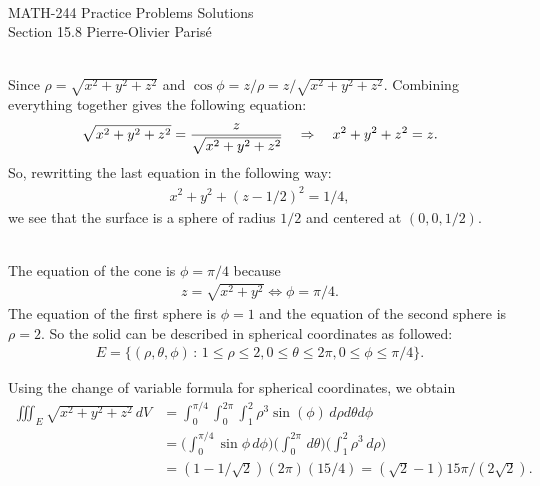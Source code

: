 


	\noindent \hrulefill \\
	MATH-244 \semester \hfill Practice Problems Solutions\\
	Section 15.8 \hfill Pierre-Olivier Paris{\'e} \\\vspace*{-1cm}
	
	\noindent\hrulefill
	
	\spc	

	\\
	Since $\rho = \sqrt{x^2 + y^2 + z^2}$ and $\cos \phi = z/\rho = z/\sqrt{x^2 + y^2 + z^2}$. Combining everything together gives the following equation:
		\begin{align*}
		\sqrt{x^2 + y^2 + z^2} = \frac{z}{\sqrt{x^2 + y^2 + z^2}} \quad \Rightarrow \quad x^2 + y^2 + z^2 = z .
		\end{align*}
	So, rewritting the last equation in the following way:
		\begin{align*}
		x^2+ y^2 + (z - 1/2)^2 = 1/4, 
		\end{align*}
	we see that the surface is a sphere of radius $1/2$ and centered at $(0, 0, 1/2)$.
	
	\spc

	\\
	The equation of the cone is $\phi = \pi/4$ because
		\begin{align*}
		z = \sqrt{x^2 + y^2} \iff \phi = \pi/4 .
		\end{align*}
	The equation of the first sphere is $\phi = 1$ and the equation of the second sphere is $\rho = 2$. So the solid can be described in spherical coordinates as followed:
		\begin{align*}
		E = \{ (\rho , \theta , \phi ) \, : \, 1 \leq \rho \leq 2 , 0 \leq \theta \leq 2 \pi , 0 \leq \phi \leq \pi/4 \} .
		\end{align*}
	
	Using the change of variable formula for spherical coordinates, we obtain
		\begin{align*}
		\iiint_E \sqrt{x^2 + y^2 + z^2} \, dV &= \int_0^{\pi/4} \int_{0}^{2\pi} \int_1^2 \rho^3 \sin (\phi ) \, d\rho d\theta d\phi \\
		&= \Big( \int_0^{\pi/4} \sin \phi \, d\phi \Big) \Big( \int_0^{2\pi} \, d\theta \Big) \Big( \int_1^2 \rho^3 \, d\rho \Big) \\
		&= (1-1/\sqrt{2}) (2\pi) (15/4) = (\sqrt{2} - 1) 15 \pi /(2\sqrt{2}) .
		\end{align*}
	
